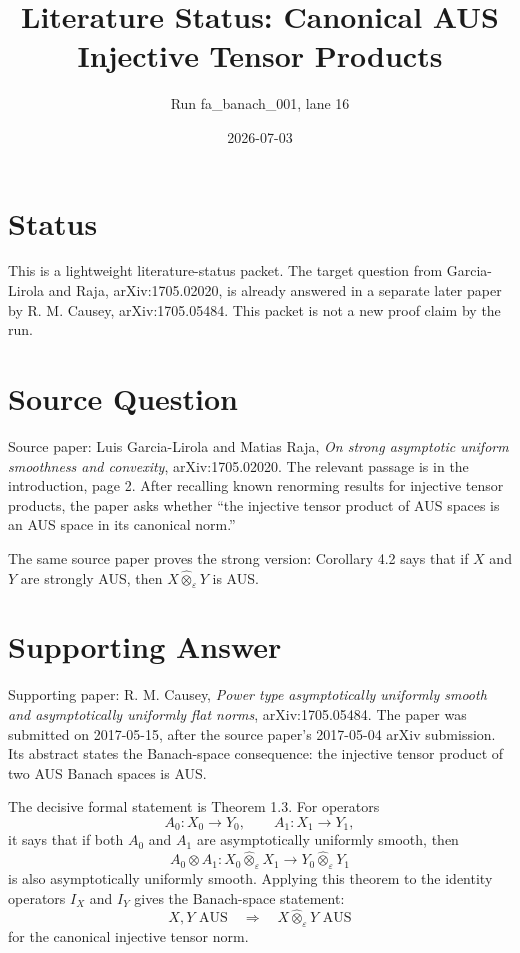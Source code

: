 \documentclass[11pt]{article}
\title{Literature Status: Canonical AUS Injective Tensor Products}
\author{Run fa\_banach\_001, lane 16}
\date{2026-07-03}
\begin{document}
\maketitle

\section*{Status}

This is a lightweight literature-status packet.  The target question from
Garcia-Lirola and Raja, arXiv:1705.02020, is already answered in a separate
later paper by R. M. Causey, arXiv:1705.05484.  This packet is not a new proof
claim by the run.

\section*{Source Question}

Source paper: Luis Garcia-Lirola and Matias Raja, \emph{On strong asymptotic
uniform smoothness and convexity}, arXiv:1705.02020.
The relevant passage is in the introduction, page 2.  After recalling known
renorming results for injective tensor products, the paper asks whether ``the
injective tensor product of AUS spaces is an AUS space in its canonical norm.''

The same source paper proves the strong version: Corollary 4.2 says that if
\(X\) and \(Y\) are strongly AUS, then \(X \hat\otimes_\varepsilon Y\) is AUS.

\section*{Supporting Answer}

Supporting paper: R. M. Causey, \emph{Power type asymptotically uniformly
smooth and asymptotically uniformly flat norms}, arXiv:1705.05484.
The paper was submitted on 2017-05-15, after the source paper's 2017-05-04
arXiv submission.  Its abstract states the Banach-space consequence: the
injective tensor product of two AUS Banach spaces is AUS.

The decisive formal statement is Theorem 1.3.  For operators
\[
A_0:X_0\to Y_0,\qquad A_1:X_1\to Y_1,
\]
it says that if both \(A_0\) and \(A_1\) are asymptotically uniformly smooth,
then
\[
A_0\otimes A_1:
X_0\hat\otimes_\varepsilon X_1\to
Y_0\hat\otimes_\varepsilon Y_1
\]
is also asymptotically uniformly smooth.  Applying this theorem to the identity
operators \(I_X\) and \(I_Y\) gives the Banach-space statement:
\[
X,Y\text{ AUS}\quad\Longrightarrow\quad
X\hat\otimes_\varepsilon Y\text{ AUS}
\]
for the canonical injective tensor norm.
\end{document}
